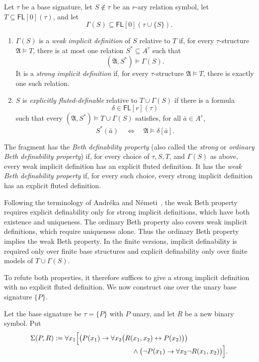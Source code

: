 \documentclass{lmcs}
\newcommand{\FL}{\mathsf{FL}}
\newcommand{\A}{\mathfrak{A}}
\begin{document}
\begin{defi}\label{def:wbdp}
Let $\tau$ be a base signature, let $S\notin\tau$ be an $r$-ary relation
symbol, let $T\subseteq\FL[0](\tau)$, and let
\[
   \Gamma(S)\subseteq\FL[0](\tau\cup\{S\}).
\]
\begin{enumerate}[label=\textup{(\roman*)}]
  \item $\Gamma(S)$ is a \emph{weak implicit definition} of $S$ relative to
  $T$ if, for every $\tau$-structure $\A\models T$, there is at most one
  relation $S^{\ast}\subseteq A^r$ such that
  \[
      (\A,S^{\ast})\models\Gamma(S).
  \]
  It is a \emph{strong implicit definition} if, for every
  $\tau$-structure $\A\models T$, there is exactly one such relation.
  \item $S$ is \emph{explicitly fluted-definable} relative to
  $T\cup\Gamma(S)$ if there is a formula
  \[
      \delta\in\FL[r](\tau)
  \]
  such that every $(\A,S^{\ast})\models T\cup\Gamma(S)$ satisfies, for all $\bar a\in A^r$,
  \[
       S^{\ast}(\bar a)
       \quad\Longleftrightarrow\quad
       \A\models\delta[\bar a].
  \]
\end{enumerate}
The fragment has the \emph{Beth definability property} (also called the
\emph{strong} or \emph{ordinary Beth definability property}) if, for every
choice of $\tau,S,T$, and $\Gamma(S)$ as above, every weak implicit definition
has an explicit fluted definition.  It has the \emph{weak Beth definability
property} if, for every such choice, every strong implicit definition has an
explicit fluted definition.
\end{defi}

Following the terminology of Andr\'eka and
N\'emeti~\cite[Definition~2]{AndrekaNemeti2021}, the weak Beth property requires explicit
definability only for strong implicit definitions, which have both existence
and uniqueness.  The ordinary Beth property also covers weak implicit
definitions, which require uniqueness alone.  Thus the ordinary Beth property
implies the weak Beth property.  In the finite versions, implicit
definability is required only over finite base structures and explicit
definability only over finite models of $T\cup\Gamma(S)$.

To refute both properties, it therefore suffices to give a strong implicit
definition with no explicit fluted definition.  We now construct one over the
unary base signature $\{P\}$.

Let the base signature be $\tau=\{P\}$ with $P$ unary, and let $R$ be a new
binary symbol.  Put
\begin{align}
 \Sigma(P,R):={}&\forall x_1\Bigl[
   \bigl(P(x_1)\rightarrow
      \forall x_2\bigl(R(x_1,x_2)\leftrightarrow P(x_2)\bigr)\bigr)
   \notag\\[-1mm]
   &\hspace{34mm}\wedge
   \bigl(\neg P(x_1)\rightarrow
      \forall x_2\neg R(x_1,x_2)\bigr)
 \Bigr].
 \label{eq:sigma-beth}
\end{align}
\end{document}
